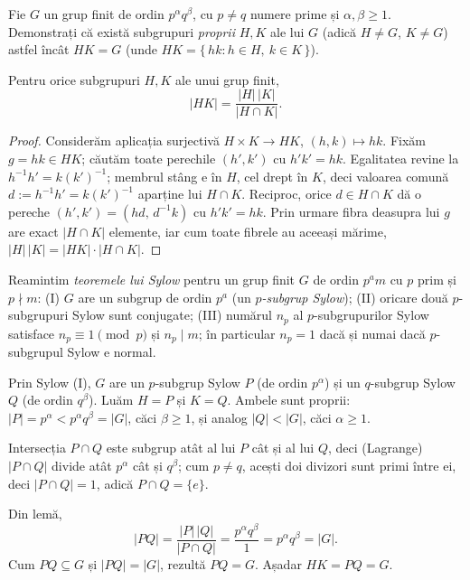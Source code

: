 \begin{problema}
Fie $G$ un grup finit de ordin $p^{\alpha}q^{\beta}$, cu $p\neq q$ numere
prime și $\alpha,\beta\ge 1$. Demonstrați că există
subgrupuri \emph{proprii} $H,K$ ale lui $G$ (adică $H\neq G$, $K\neq G$) astfel încât $HK=G$ (unde
$HK=\{\,hk : h\in H,\ k\in K\,\}$).
\end{problema}

\begin{lemat}
Pentru orice subgrupuri $H,K$ ale unui grup finit,
\[
  |HK|=\frac{|H|\,|K|}{|H\cap K|}.
\]
\end{lemat}

\begin{proof}
Considerăm aplicația surjectivă $H\times K\to HK$,
$(h,k)\mapsto hk$. Fixăm $g=hk\in HK$; căutăm toate perechile
$(h',k')$ cu $h'k'=hk$. Egalitatea revine la $h^{-1}h'=k(k')^{-1}$; membrul
stâng e în $H$, cel drept în $K$, deci valoarea comună
$d:=h^{-1}h'=k(k')^{-1}$ aparține lui $H\cap K$. Reciproc, orice
$d\in H\cap K$ dă o pereche $(h',k')=(hd,\,d^{-1}k)$ cu $h'k'=hk$. Prin
urmare fibra deasupra lui $g$ are exact $|H\cap K|$ elemente, iar cum toate
fibrele au aceeași mărime,
$|H|\,|K|=|HK|\cdot|H\cap K|$.
\end{proof}

\begin{solutie}
Reamintim \emph{teoremele lui Sylow} pentru un grup finit $G$ de ordin
$p^{a}m$ cu $p$ prim și $p\nmid m$: (I) $G$ are un subgrup de ordin
$p^{a}$ (un \emph{$p$-subgrup Sylow}); (II) oricare două $p$-subgrupuri
Sylow sunt conjugate; (III) numărul $n_{p}$ al $p$-subgrupurilor Sylow
satisface $n_{p}\equiv 1\pmod p$ și $n_{p}\mid m$; în particular
$n_{p}=1$ dacă și numai dacă $p$-subgrupul Sylow e normal.

Prin Sylow (I), $G$ are un $p$-subgrup Sylow $P$ (de ordin
$p^{\alpha}$) și un $q$-subgrup Sylow $Q$ (de ordin $q^{\beta}$). Luăm
$H=P$ și $K=Q$. Ambele sunt proprii: $|P|=p^{\alpha}<p^{\alpha}q^{\beta}=|G|$,
căci $\beta\ge1$, și analog $|Q|<|G|$, căci $\alpha\ge1$.

Intersecția $P\cap Q$ este subgrup atât al lui $P$ cât și al
lui $Q$, deci (Lagrange) $|P\cap Q|$ divide atât $p^{\alpha}$ cât
și $q^{\beta}$; cum $p\neq q$, acești doi divizori sunt primi
între ei, deci $|P\cap Q|=1$, adică $P\cap Q=\{e\}$.

Din lemă,
\[
  |PQ|=\frac{|P|\,|Q|}{|P\cap Q|}=\frac{p^{\alpha}q^{\beta}}{1}=p^{\alpha}q^{\beta}=|G|.
\]
Cum $PQ\subseteq G$ și $|PQ|=|G|$, rezultă $PQ=G$. Așadar
$HK=PQ=G$.
\end{solutie}

